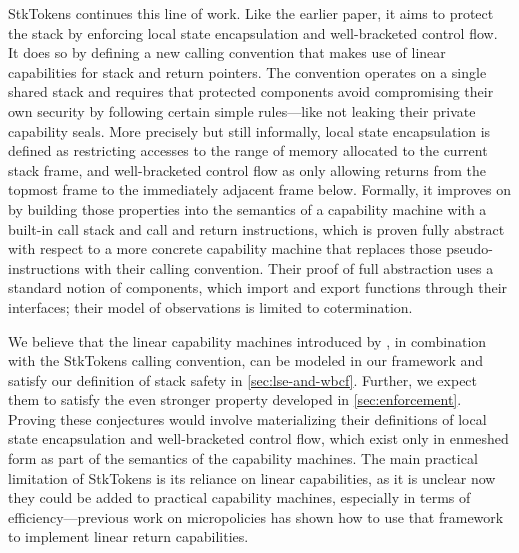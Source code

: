 \documentclass[acmsmall,review,anonymous]{acmart}\settopmatter{printfolios=true,printccs=false,printacmref=false}
\begin{document}
{StkTokens \citep{Skorstengaard+19} continues this line of work. Like
the earlier paper, it aims to protect the stack by enforcing local state
encapsulation and well-bracketed control flow. It does so by defining a new
calling convention that makes use of linear capabilities for stack and return
pointers. The convention operates on a single shared stack and requires that
protected components avoid compromising their own security by following certain
simple rules---like not leaking their private capability seals. More
precisely but still informally, local state encapsulation is defined as
restricting accesses to the range of memory allocated to the current stack
frame, and well-bracketed control flow as only allowing returns from the topmost
frame to the immediately adjacent frame below. Formally, it improves on
\citet{Skorstengaard+19b} by building those properties into the semantics of a
capability machine with a built-in call stack and call and return instructions,
which is proven fully abstract with respect to a more concrete capability
machine that replaces those pseudo-instructions with their calling convention.
Their proof of full abstraction uses a standard notion of components, which
import and export functions through their interfaces; their model of
observations is limited to cotermination.

We believe that the linear capability machines introduced by
\citep{Skorstengaard+19}, in combination with the StkTokens calling convention,
can be modeled in our framework and satisfy our definition of stack safety in
\cref{sec:lse-and-wbcf}. Further, we expect them to satisfy the even stronger
property developed in \cref{sec:enforcement}. Proving these conjectures would
involve materializing their definitions of local state encapsulation and
well-bracketed control flow, which exist only in enmeshed form as part of the
semantics of the capability machines. The main practical limitation of StkTokens
is its reliance on linear capabilities, as it is unclear now they could be added
to practical capability machines, especially in terms of efficiency---previous
work on micropolicies \citep{yannis-report} has shown how to use that framework
to implement linear return capabilities.

}
\end{document}
